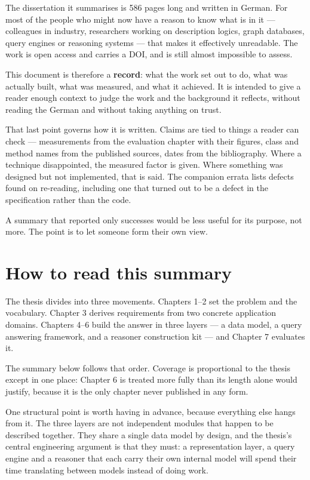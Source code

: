 \documentclass[11pt,a4paper,DIV=12,parskip=half]{scrartcl}
\begin{document}
The dissertation it summarises is 586 pages long and written in German. For most
of the people who might now have a reason to know what is in it --- colleagues in
industry, researchers working on description logics, graph databases, query
engines or reasoning systems --- that makes it effectively unreadable. The work
is open access and carries a DOI, and is still almost impossible to assess.

This document is therefore a \textbf{record}: what the work set out to do, what
was actually built, what was measured, and what it achieved. It is intended to
give a reader enough context to judge the work and the background it reflects,
without reading the German and without taking anything on trust.

That last point governs how it is written. Claims are tied to things a reader can
check --- measurements from the evaluation chapter with their figures, class and
method names from the published sources, dates from the bibliography. Where a
technique disappointed, the measured factor is given. Where something was
designed but not implemented, that is said. The companion errata lists defects
found on re-reading, including one that turned out to be a defect in the
specification rather than the code.

A summary that reported only successes would be less useful for its purpose, not
more. The point is to let someone form their own view.

\section{How to read this summary}

The thesis divides into three movements. Chapters 1--2 set the problem and the
vocabulary. Chapter 3 derives requirements from two concrete application
domains. Chapters 4--6 build the answer in three layers --- a data model, a
query answering framework, and a reasoner construction kit --- and Chapter 7
evaluates it.

The summary below follows that order. Coverage is proportional to the thesis
except in one place: Chapter 6 is treated more fully than its length alone
would justify, because it is the only chapter never published in any form.

One structural point is worth having in advance, because everything else hangs
from it. The three layers are not independent modules that happen to be
described together. They share a single data model by design, and the thesis's
central engineering argument is that they must: a representation layer, a query
engine and a reasoner that each carry their own internal model will spend their
time translating between models instead of doing work.
\end{document}
